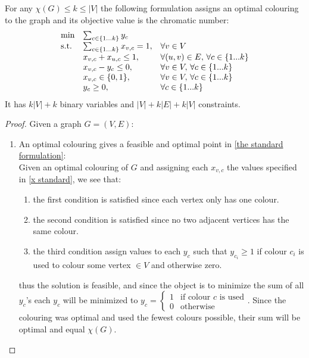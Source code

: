 \begin{proposition}
For any $\chi(G) \leq k \leq |V|$ the following formulation assigns an optimal colouring to the graph and its objective value is the chromatic number:
\begin{align}\label{the standard formulation}
\begin{array}{ll@{}ll}
\text{min} &\sum_{c\in \{1...k\}} y_c&\\
\text{s.t.} 
&\sum_{c\in \{1...k\}}{x_{v,c}} = 1, \quad & \forall v \in V\\
&x_{v,c} + x_{u,c} \leq 1,& \forall (u,v)\in E, \, \forall c \in \{1...k\}\\
&x_{v,c} - y_c \leq 0,& \forall v \in V, \,\forall c \in \{1...k\}\\
&x_{v,c}\in\{0,1\},& \forall v \in V, \, \forall c \in \{1...k\}\\
&y_c \geq 0,& \forall c \in \{1...k\}\\
\end{array}
\end{align}
It has $k|V|+k$ binary variables and $|V|+k|E|+k|V|$ constraints.
\begin{proof}
Given a graph $G = (V,E)$:
\begin{enumerate}
\item An optimal colouring gives a feasible and optimal point in \ref{the standard formulation}:\\
Given an optimal colouring of $G$ and assigning each $x_{v,c}$ the values specified in \ref{x standard}, we see that:
\begin{enumerate}
\item the first condition is satisfied since each vertex only has one colour.
\item the second condition is satisfied since no two adjacent vertices has the same colour.
\item the third condition assign values to each $y_c$ such that $y_{c_i} \geq 1$ if colour $c_i$ is used to colour some vertex $\in V$ and otherwise zero.
\end{enumerate}
thus the solution is feasible, and since the object is to minimize the sum of all $y_c$'s each $y_c$ will be minimized to 
$y_c =\left\{
\begin{array}{ll}
1 & \text{if colour }c \text{ is used} \\ 0 & \text{otherwise}
\end{array}\right. $. Since the colouring was optimal and used the fewest colours possible, their sum will be optimal and equal $\chi(G)$. 

\end{enumerate}
\end{proof}
\end{proposition}
